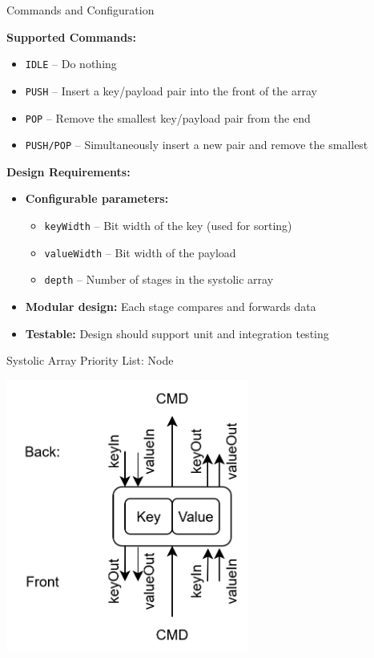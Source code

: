\begin{frame}{Commands and Configuration}
	
	\textbf{Supported Commands:}
	\begin{itemize}
		\item \texttt{IDLE} -- Do nothing
		\item \texttt{PUSH} -- Insert a key/payload pair into the front of the array
		\item \texttt{POP} -- Remove the smallest key/payload pair from the end
		\item \texttt{PUSH/POP} -- Simultaneously insert a new pair and remove the smallest
	\end{itemize}
	
	\pause
	\vspace{0.5em}
	\textbf{Design Requirements:}
	\begin{itemize}
		\item \textbf{Configurable parameters:}
		\begin{itemize}
			\item \texttt{keyWidth} -- Bit width of the key (used for sorting)
			\item \texttt{valueWidth} -- Bit width of the payload
			\item \texttt{depth} -- Number of stages in the systolic array
		\end{itemize}
		\item \textbf{Modular design:} Each stage compares and forwards data
		\item \textbf{Testable:} Design should support unit and integration testing
	\end{itemize}
	
\end{frame}

\begin{frame}{Systolic Array Priority List: Node}
	\centering
	
	\begin{center}
		\includegraphics[width=0.6\textwidth]{images/systolic node.png}
	\end{center}
\end{frame}

